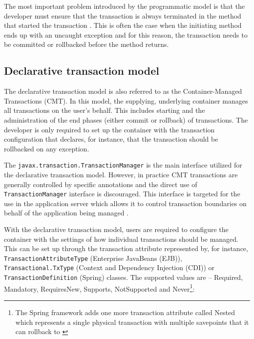 \documentclass[oneside,
  digital, %
  table,   %
  lof,     %
  lot,     %
]{fithesis3}
\begin{document}
The most important problem introduced by the programmatic model is that the developer must ensure that the transaction is always terminated in the method that started the transaction \cite{java_transaction_design_strategies}. This is often the case when the initiating method ends up with an uncaught exception and for this reason, the transaction needs to be committed or rollbacked before the method returns.

\subsection{Declarative transaction model}
\label{sec:decl-tran-model}

The declarative transaction model is also referred to as the Container-Managed Transactions (CMT). In this model, the supplying, underlying container manages all transactions on the user's behalf. This includes starting and the administration of the end phases (either commit or rollback) of transactions. The developer is only required to set up the container with the transaction configuration that declares, for instance, that the transaction should be rollbacked on any exception.

The \texttt{javax.transaction.TransactionManager} is the main interface utilized for the declarative transaction model. However, in practice CMT transactions are generally controlled by specific annotations and the direct use of \texttt{TransactionManager} interface is discouraged. This interface is targeted for the use in the application server which allows it to control transaction boundaries on behalf of the application being managed \cite{jta}.

With the declarative transaction model, users are required to configure the container with the settings of how individual transactions should be managed. This can be set up through the transaction attribute represented by, for instance, \texttt{TransactionAttributeType} (Enterprise JavaBeans (EJB)), \texttt{Transactional.TxType} (Context and Dependency Injection (CDI)) or \texttt{TransactionDefinition} (Spring) classes. The supported values are -- Required, Mandatory, RequiresNew, Supports, NotSupported and Never\footnote{The Spring framework adds one more transaction attribute called Nested which represents a single physical transaction with multiple savepoints that it can rollback to \cite{spring_transaction_management_documentation}}:
\end{document}
